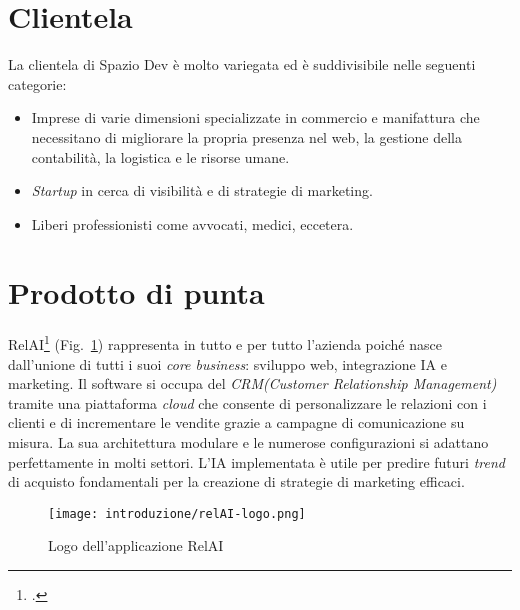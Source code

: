 \section{Clientela}
La clientela di Spazio Dev è molto variegata ed è suddivisibile nelle seguenti categorie:
\begin{itemize}
  \item Imprese di varie dimensioni specializzate in commercio e manifattura che necessitano di migliorare la propria presenza nel web, la gestione della contabilità, la logistica e le risorse umane.
  \item \emph{Startup} in cerca di visibilità e di strategie di marketing.
  \item Liberi professionisti come avvocati, medici, eccetera.
\end{itemize}



\section{Prodotto di punta}
RelAI\footcite{site:relai} (Fig.~\ref{fig:logo-RelAI}) rappresenta in tutto e per tutto l'azienda poiché nasce dall'unione di tutti i suoi \emph{core business}: sviluppo web, integrazione IA e marketing.
Il software si occupa del \emph{\gls{CRM}\glsfirstoccur (Customer Relationship Management)}  tramite una piattaforma \emph{cloud} che consente di personalizzare le relazioni con i clienti e di incrementare le vendite grazie a campagne di comunicazione su misura.
La sua architettura modulare e le numerose configurazioni si adattano perfettamente in molti settori. L'IA implementata è utile per predire futuri \emph{trend} di acquisto fondamentali per la creazione di strategie di marketing efficaci. 


\begin{figure}[!h] 
  \centering 
  \texttt{[image: introduzione/relAI-logo.png]} 
  \caption{Logo dell'applicazione RelAI}
  \label{fig:logo-RelAI}
\end{figure}



